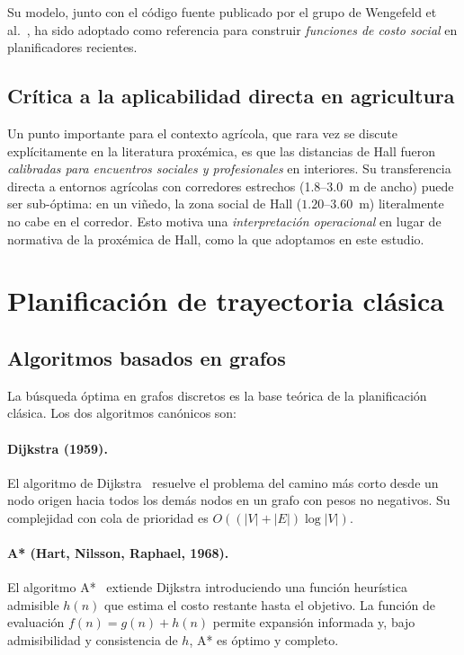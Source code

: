 \documentclass[12pt,a4paper,oneside]{book}
\begin{document}
Su modelo, junto con el código fuente publicado por el grupo de Wengefeld et al.~\cite{Wengefeld2022}, ha sido adoptado como referencia para construir \emph{funciones de costo social} en planificadores recientes.

\subsection{Crítica a la aplicabilidad directa en agricultura}

Un punto importante para el contexto agrícola, que rara vez se discute explícitamente en la literatura proxémica, es que las distancias de Hall fueron \emph{calibradas para encuentros sociales y profesionales} en interiores. Su transferencia directa a entornos agrícolas con corredores estrechos (1.8--3.0~m de ancho) puede ser sub-óptima: en un viñedo, la zona social de Hall ($1.20$--$3.60$~m) literalmente no cabe en el corredor. Esto motiva una \emph{interpretación operacional} en lugar de normativa de la proxémica de Hall, como la que adoptamos en este estudio.

\newpage
\section{Planificación de trayectoria clásica}
\label{doc7:sec:planning}

\subsection{Algoritmos basados en grafos}

La búsqueda óptima en grafos discretos es la base teórica de la planificación clásica. Los dos algoritmos canónicos son:

\paragraph{Dijkstra (1959).} El algoritmo de Dijkstra~\cite{Dijkstra1959} resuelve el problema del camino más corto desde un nodo origen hacia todos los demás nodos en un grafo con pesos no negativos. Su complejidad con cola de prioridad es $O((|V|+|E|)\log|V|)$.

\paragraph{A* (Hart, Nilsson, Raphael, 1968).} El algoritmo A*~\cite{Hart1968} extiende Dijkstra introduciendo una función heurística admisible $h(n)$ que estima el costo restante hasta el objetivo. La función de evaluación $f(n)=g(n)+h(n)$ permite expansión informada y, bajo admisibilidad y consistencia de $h$, A* es óptimo y completo.
\end{document}
